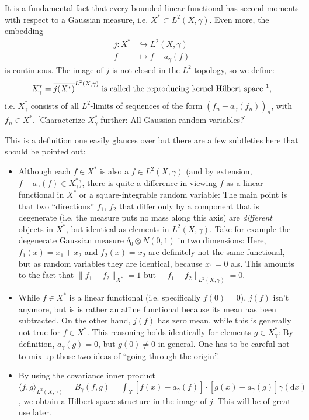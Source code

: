 \documentclass{scrartcl}
\theoremstyle{definition}
\theoremstyle{remark}
\newcommand{\de}{\mathrm d}
\newcommand{\ednote}[1]{{\color{red}[#1]}}
\begin{document}
It is a fundamental fact that every bounded linear functional has second moments with respect to a Gaussian measure, i.e. $X^*\subset L^2(X, \gamma)$. Even more, the embedding
\begin{align*}
j: X^* &\hookrightarrow L^2(X, \gamma)\\
f &\mapsto f - a_\gamma(f)
\end{align*}
is continuous. 
The image of $j$ is not closed in the $L^2$ topology, so we define:
\[ X_\gamma^* = \overline{j(X^*)}^{L^2(X,\gamma)} \text{ is called the reproducing kernel Hilbert space \footnotemark},\]
i.e. $X_\gamma^*$ consists of all $L^2$-limits of sequences of the form $(f_n-a_\gamma(f_n))_n$, with $f_n\in X^*$. \ednote{Characterize $X_\gamma^*$ further: All Gaussian random variables?}

This is a definition one easily glances over but there are a few subtleties here that should be pointed out:
\begin{itemize}
\item Although each $f\in X^*$ is also a $f\in L^2(X, \gamma)$ (and by extension, $f-a_\gamma(f)\in X_\gamma^*$), there is quite a difference in viewing $f$ as a linear functional in $X^*$ or a square-integrable random variable: The main point is that two ``directions'' $f_1$, $f_2$ that differ only by a component that is degenerate (i.e. the measure puts no mass along this axis) are \textit{different} objects in $X^*$, but identical as elements in $L^2(X,\gamma)$. Take for example the degenerate Gaussian measure $\delta_0 \otimes N(0,1)$ in two dimensions: Here, $f_1(x) = x_1+x_2$ and $f_2(x) = x_2$ are definitely not the same functional, but as random variables they are identical, because $x_1 = 0$ a.s. This amounts to the fact that $\|f_1-f_2\|_{X^*} = 1$ but $\|f_1-f_2\|_{L^2(X,\gamma)} = 0$.
\item While $f\in X^*$ is a linear functional (i.e. specifically $f(0)=0$), $j(f)$ isn't anymore, but is is rather an affine functional because its mean has been subtracted. On the other hand, $j(f)$ has zero mean, while this is generally not true for $f\in X^*$. This reasoning holds identically for elements $g\in X_\gamma^*$: By definition, $a_\gamma(g) = 0$, but $g(0)\neq 0$ in general. One has to be careful not to mix up those two ideas of ``going through the origin''.
\item By using the covariance inner product $\langle f, g\rangle_{L^2(X, \gamma)} = B_\gamma(f, g) = \int_X [f(x) - a_\gamma(f)]\cdot [g(x)-a_\gamma(g)]\gamma(\de x)$, we obtain a Hilbert space structure in the image of $j$. This will be of great use later. 
\end{itemize}
\end{document}
